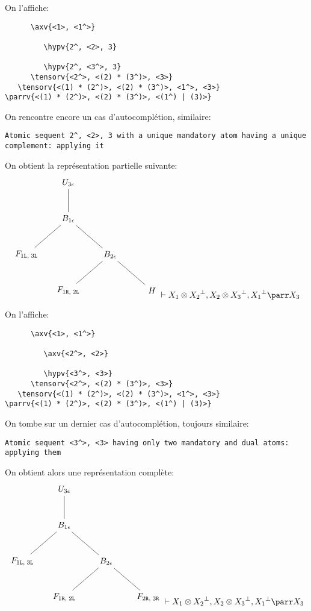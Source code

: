 \documentclass[11pt,a4paper]{article}
\theoremstyle{plain}
\theoremstyle{definition}
\theoremstyle{remark}
\newcommand*{\orth}{^\perp}
\newcommand*{\tensor}{\otimes}
\newcommand*{\hypv}[1]{\hypo{\vdash #1}}
\newcommand*{\axv}[1]{\infer{0}[\ensuremath{\mathit{ax}}]{\vdash #1}}
\newcommand*{\tensorv}[1]{\infer{2}[\ensuremath{\tensor}]{\vdash #1}}
\newcommand*{\parrv}[1]{\infer{1}[\ensuremath{\parr}]{\vdash #1}}
\newcommand*{\Left}{\textnormal{\texttt{L}}}
\newcommand*{\Right}{\textnormal{\texttt{R}}}
\newcommand*{\unknown}{H}
\begin{document}
On l'affiche:

\begin{verbatim}
      \axv{<1>, <1^>}

         \hypv{2^, <2>, 3}

         \hypv{2^, <3^>, 3}
      \tensorv{<2^>, <(2) * (3^)>, <3>}
   \tensorv{<(1) * (2^)>, <(2) * (3^)>, <1^>, <3>}
\parrv{<(1) * (2^)>, <(2) * (3^)>, <(1^) | (3)>}
\end{verbatim}

On rencontre encore un cas d'autocomplétion, similaire:
\begin{verbatim}
Atomic sequent 2^, <2>, 3 with a unique mandatory atom having a unique
complement: applying it
\end{verbatim}

On obtient la représentation partielle suivante:
\begin{equation*}
    \begin{tikzpicture}%
        [level 2/.style={sibling distance=3.5cm}]
        \node {$U_{3 \epsilon}$}
        child {node {$B_{1 \epsilon}$}
            child {node {$F_{1 \Left, \; 3 \Left}$}}
            child {node {$B_{2 \epsilon}$}
                child{node {$F_{1 \Right, \; 2 \Left}$}}
                child{node {$\unknown$}}}
        };
    \end{tikzpicture} \vdash X_1 \tensor {X_2}\orth, X_2 \tensor {X_3}\orth, {X_1}\orth \parr X_3
\end{equation*}

On l'affiche:

\begin{verbatim}
      \axv{<1>, <1^>}

         \axv{<2^>, <2>}

         \hypv{<3^>, <3>}
      \tensorv{<2^>, <(2) * (3^)>, <3>}
   \tensorv{<(1) * (2^)>, <(2) * (3^)>, <1^>, <3>}
\parrv{<(1) * (2^)>, <(2) * (3^)>, <(1^) | (3)>}
\end{verbatim}

On tombe sur un dernier cas d'autocomplétion, toujours similaire:
\begin{verbatim}
Atomic sequent <3^>, <3> having only two mandatory and dual atoms: 
applying them
\end{verbatim}

On obtient alors une représentation complète:
\begin{equation*}
    \begin{tikzpicture}%
        [level 2/.style={sibling distance=3.5cm}]
        \node {$U_{3 \epsilon}$}
        child {node {$B_{1 \epsilon}$}
            child {node {$F_{1 \Left, \; 3 \Left}$}}
            child {node {$B_{2 \epsilon}$}
                child{node {$F_{1 \Right, \; 2 \Left}$}}
                child{node {$F_{2 \Right, \; 3 \Right}$}}}
        };
    \end{tikzpicture} \vdash X_1 \tensor {X_2}\orth, X_2 \tensor {X_3}\orth, {X_1}\orth \parr X_3
\end{equation*}
\end{document}
